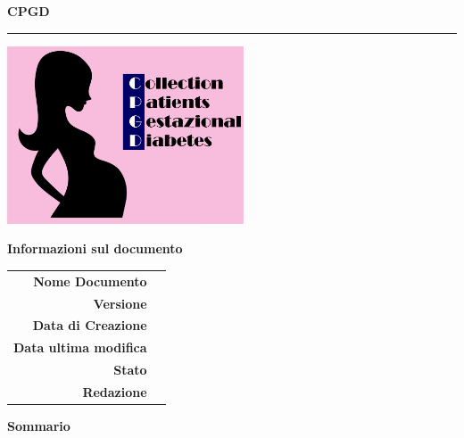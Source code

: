 \begin{center}

\begin{large} \textbf{CPGD} \end{large}
\vspace{0.2em}

\hrule
\vspace{7em}

\includegraphics[keepaspectratio = true, width=7cm]{../Template/icone/Logo.png}

\thispagestyle{empty}

\vspace{1.5em}

\begin{center} 
  \begin{Huge}
  \end{Huge}
\end{center}


\begin{Huge} \documento \end{Huge}

\begin{center}
\textbf{Informazioni sul documento} \\ \vspace{2em}
\small
\begin{tabular}{r|l}
	\textbf{Nome Documento} & \nomedocumentofisico \\
	\textbf{Versione}	& \versione\\
	\textbf{Data di Creazione} & \datacreazione\\
	\textbf{Data ultima modifica} & \datamodifica\\
	\textbf{Stato} & \stato \\
	\textbf{Redazione}	& \redazione\\
\end{tabular}
\end{center}

\normalsize
\textbf{Sommario\\} 

\end{center}
\clearpage
